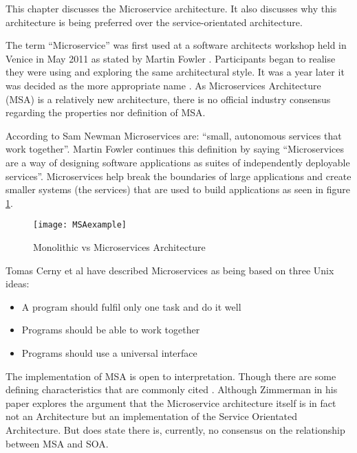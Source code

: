 This chapter discusses the Microservice architecture. It also discusses why this architecture is being preferred over the service-orientated architecture.

The term “Microservice” was first used at a software architects workshop held in Venice in May 2011 as stated by Martin Fowler \cite{MartinFowlersite}. Participants began to realise they were using and exploring the same architectural style. It was a year later it was decided as the more appropriate name \cite{MartinFowlersite}.
As Microservices Architecture (MSA) is a relatively new architecture, there is no official industry consensus regarding the properties nor definition of MSA.

According to Sam Newman \cite{NewmanMSA} Microservices are: “small, autonomous services that work together”. Martin Fowler \cite{MartinFowlersite} continues this definition by saying “Microservices are a way of designing software applications as suites of independently deployable services”.
Microservices help break the boundaries of large applications and create smaller systems (the services) that are used to build applications as seen in figure \ref{fig:MonovMSA}.
\begin{figure}[h]
	\caption{Monolithic vs Microservices Architecture}
	\label{fig:MonovMSA}
	\texttt{[image: MSAexample]}
	\centering
\end{figure}
Tomas Cerny et al \cite{ContextUnderstandingMSA} have described Microservices as being based on three Unix ideas:
\begin{itemize}
	\item A program should fulfil only one task and do it well
	\item Programs should be able to work together
	\item Programs should use a universal interface
\end{itemize}
The implementation of MSA is open to interpretation. Though there are some defining characteristics that are commonly cited \cite{GuptaMSA} \cite{MartinFowlersite} \cite{ContextUnderstandingMSA}. Although
Zimmerman in his paper \cite{Zimmermann2017} explores the argument that the Microservice architecture itself is in fact not an Architecture but an implementation of the Service Orientated Architecture. But does state there is, currently, no consensus on the relationship between MSA and SOA.

